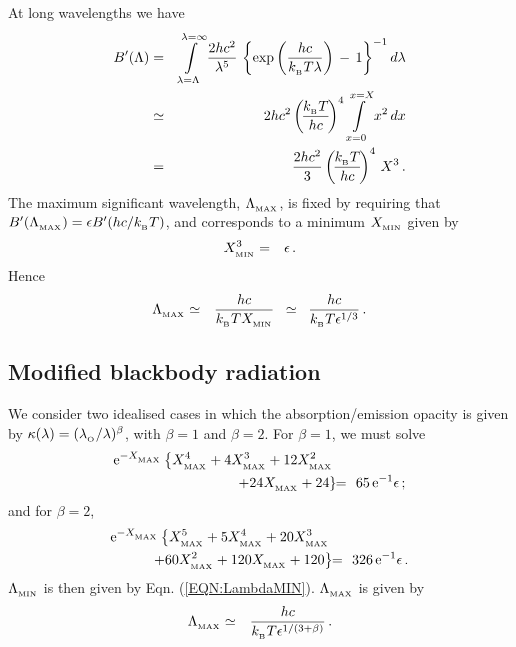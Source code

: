 \documentclass[usenatbib]{mn2e}
\numberwithin{equation}{section}
\begin{document}
At long wavelengths we have 
\begin{eqnarray}\nonumber
B'(\Lambda)&=&\int\limits_{\lambda=\Lambda}^{\lambda=\infty}\frac{2hc^2}{\lambda^{5}}\,\left\{\exp\left(\frac{hc}{k_{_{\rm B}}T\lambda}\right)\,-\,1\right\}^{-1}d\lambda\\\nonumber
&\simeq&2hc^2\left(\!\frac{k_{_{\rm B}}T}{hc}\!\right)^4\int\limits_{x=0}^{x=X}x^2\,dx\\\nonumber
&=&\frac{2hc^2}{3}\left(\!\frac{k_{_{\rm B}}T}{hc}\!\right)^4\,X^3\,.
\end{eqnarray}
The maximum significant wavelength, $\Lambda_{_{\rm MAX}}$, is fixed by requiring that $B'(\Lambda_{_{\rm MAX}})=\epsilon B'(hc/k_{_{\rm B}}T)$, and corresponds to a minimum $X_{_{\rm MIN}}$ given by
\begin{eqnarray}
X_{_{\rm MIN}}^3&=&\epsilon\,.
\end{eqnarray}
Hence
\begin{eqnarray}
\Lambda_{_{\rm MAX}}&\simeq&\frac{hc}{k_{_{\rm B}}TX_{_{\rm MIN}}}\;\;\simeq\;\;\frac{hc}{k_{_{\rm B}}T\epsilon^{1/3}}\,.
\end{eqnarray}

\subsection{Modified blackbody radiation}

We consider two idealised cases in which the absorption/emission opacity is given by $\kappa(\lambda)=(\lambda_{_{\rm O}}/\lambda)^\beta$, with $\beta\!=\!1$ and $\beta\!=\!2$. For $\beta\!=\!1$, we must solve
\begin{eqnarray}\nonumber
{\rm e}^{-X_{_{\rm MAX}}}\left\{X_{_{\rm MAX}}^4+4X_{_{\rm MAX}}^3+12X_{_{\rm MAX}}^2\right.&&\\
\left.+24X_{_{\rm MAX}}+24\right\}\!&\!=\!&\!65\,{\rm e}^{-1}\epsilon\,;
\end{eqnarray}
and for $\beta\!=\!2$,
\begin{eqnarray}\nonumber
{\rm e}^{-X_{_{\rm MAX}}}\left\{X_{_{\rm MAX}}^5+5X_{_{\rm MAX}}^4+20X_{_{\rm MAX}}^3\right.&&\\
\left.+60X_{_{\rm MAX}}^2+120X_{_{\rm MAX}}+120\right\}\!&\!=\!&\!326\,{\rm e}^{-1}\epsilon\,.
\end{eqnarray}
$\Lambda_{_{\rm MIN}}$ is then given by Eqn. (\ref{EQN:LambdaMIN}). $\Lambda_{_{\rm MAX}}$ is given by
\begin{eqnarray}
\Lambda_{_{\rm MAX}}&\simeq&\frac{hc}{k_{_{\rm B}}T\epsilon^{1/(3+\beta)}}\,.
\end{eqnarray}
\end{document}
